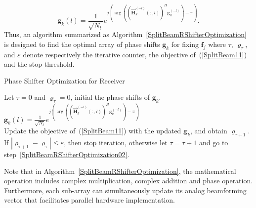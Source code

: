 \documentclass[11pt,draftcls,onecolumn]{IEEEtran}
\begin{document}
\begin{equation}\label{SplitBeam13}
\bm{g}_{k}\left(l\right)=\frac{1}{\sqrt{N_{t}}}e^{j\left(\arg\left(\left(\overrightarrow{\bm{H}}_{k}^{\left(-l\right)}
\left(:,l\right)\right)^{H}\bm{g}_{k}^{\left(-l\right)}\right)-\pi\right)}.
\end{equation}
Thus, an algorithm summarized as Algorithm~\ref{SplitBeamRShifterOptimization} is designed to find the optimal array of phase shifts $\bm{g}_{k}$ for fixing $\bm{f}_{j}$ where $\tau$, $\varrho_{\tau}$, and $\varepsilon$ denote respectively the iterative counter, the objective of~(\ref{SplitBeam11}) and the stop threshold.
\begin{algorithm}
\caption{Phase Shifter Optimization for Receiver}\label{SplitBeamRShifterOptimization}
\begin{algorithmic}[1]
\STATE Let $\tau=0$ and $\varrho_{\tau}=0$, initial the phase shifts of $\bm{g}_{k}$.\label{SplitBeamRShifterOptimization01}
 \label{SplitBeamRShifterOptimization02}
\STATE $\bm{g}_{k}\left(l\right)=\frac{1}{\sqrt{N_{t}}}e^{j\left(\arg\left(\left(\overrightarrow{\bm{H}}_{k}^{\left(-l\right)}
\left(:,l\right)\right)^{H}\bm{g}_{k}^{\left(-l\right)}\right)-\pi\right)}$\\
\ENDFOR
\STATE Update the objective of~(\ref{SplitBeam11}) with the updated $\bm{g}_{k}$, and obtain $\varrho_{\tau+1}$.
\STATE If $\left|\varrho_{\tau+1}-\varrho_{\tau}\right|\leq\varepsilon$, then stop iteration, otherwise let $\tau=\tau+1$ and go to step~\ref{SplitBeamRShifterOptimization02}.
\end{algorithmic}
\end{algorithm}
Note that in Algorithm~\ref{SplitBeamRShifterOptimization}, the mathematical operation includes complex multiplication, complex addition and phase operation. Furthermore, each sub-array can simultaneously update its analog beamforming vector that facilitates parallel hardware implementation.
\end{document}
